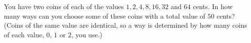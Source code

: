 You have two coins of each of the values $1,2,4,8,16,32$ and $64$ cents. In how many ways can you choose some of these coins with a total value of $50$ cents? (Coins of the same value are identical, so a way is determined by how many coins of each value, $0$, $1$ or $2$, you use.)
